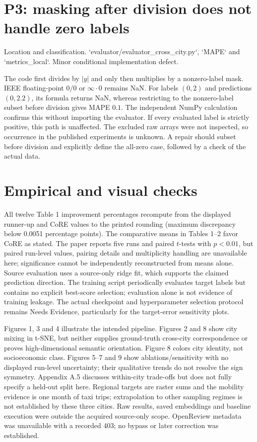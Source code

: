 \documentclass[10pt]{article}
\begin{document}
\section*{P3: masking after division does not handle zero labels}
Location and classification. `evaluator/evaluator\_cross\_city.py`, `MAPE` and `metrics\_local`. Minor conditional implementation defect.\par
The code first divides by \(|y|\) and only then multiplies by a nonzero-label mask. IEEE floating-point \(0/0\) or \(\infty\cdot0\) remains NaN. For labels \((0,2)\) and predictions \((0,2.2)\), its formula returns NaN, whereas restricting to the nonzero-label subset before division gives MAPE \(0.1\). The independent NumPy calculation confirms this without importing the evaluator. If every evaluated label is strictly positive, this path is unaffected. The excluded raw arrays were not inspected, so occurrence in the published experiments is unknown. A repair should subset before division and explicitly define the all-zero case, followed by a check of the actual data.\par
\section*{Empirical and visual checks}
All twelve Table 1 improvement percentages recompute from the displayed runner-up and CoRE values to the printed rounding (maximum discrepancy below 0.0051 percentage points). The comparative means in Tables 1–2 favor CoRE as stated. The paper reports five runs and paired \(t\)-tests with \(p<0.01\), but paired run-level values, pairing details and multiplicity handling are unavailable here; significance cannot be independently reconstructed from means alone. Source evaluation uses a source-only ridge fit, which supports the claimed prediction direction. The training script periodically evaluates target labels but contains no explicit best-score selection; evaluation alone is not evidence of training leakage. The actual checkpoint and hyperparameter selection protocol remains Needs Evidence, particularly for the target-error sensitivity plots.\par
Figures 1, 3 and 4 illustrate the intended pipeline. Figures 2 and 8 show city mixing in t-SNE, but neither supplies ground-truth cross-city correspondence or proves high-dimensional semantic orientation. Figure 8 colors city identity, not socioeconomic class. Figures 5–7 and 9 show ablations/sensitivity with no displayed run-level uncertainty; their qualitative trends do not resolve the sign symmetry. Appendix A.5 discusses within-city trade-offs but does not fully specify a held-out split here. Regional targets are raster sums and the mobility evidence is one month of taxi trips; extrapolation to other sampling regimes is not established by these three cities. Raw results, saved embeddings and baseline execution were outside the acquired source-only scope. OpenReview metadata was unavailable with a recorded 403; no bypass or later correction was established.\par
\end{document}
